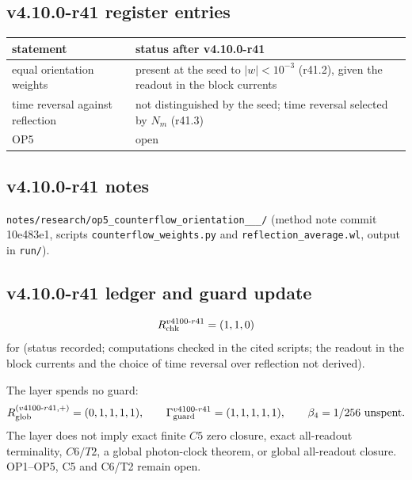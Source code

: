 \subsection*{v4.10.0-r41 register entries}
\label{subsec:v4100-r41-register}

\begin{center}
\small
\begin{tabular}{@{}>{\raggedright\arraybackslash}p{}>{\raggedright\arraybackslash}p{}@{}}
\toprule
statement & status after v4.10.0-r41\\
\midrule
equal orientation weights & present at the seed to \(|w|<10^{-3}\) (r41.2), given the readout in the block currents\\
time reversal against reflection & not distinguished by the seed; time reversal selected by \(N_m\) (r41.3)\\
OP5 & open\\
\bottomrule
\end{tabular}
\end{center}

\subsection*{v4.10.0-r41 notes}
\label{subsec:v4100-r41-notes}

\texttt{notes/\allowbreak research/\allowbreak op5\_\allowbreak counterflow\_\allowbreak orientation\_\_\_/} (method note commit 10e483e1,
scripts \texttt{counterflow\_\allowbreak weights.py} and \texttt{reflection\_\allowbreak average.wl}, output in \texttt{run/}).

\subsection*{v4.10.0-r41 ledger and guard update}
\label{subsec:v4100-r41-ledger-guard}

\[
R_{\rm chk}^{v4100\text{-}r41}=(1,1,0)
\]
for (status recorded; computations checked in the cited scripts; the readout in the block currents and the choice of time reversal over
reflection not derived).

The layer spends no guard:
\[
R_{\rm glob}^{(v4100\text{-}r41,+)}=(0,1,1,1,1),
\qquad
\Gamma_{\rm guard}^{v4100\text{-}r41}=(1,1,1,1,1),
\qquad
\beta_4=1/256\ \text{unspent}.
\]
The layer does not imply exact finite \(C5\) zero closure, exact all-readout terminality, \(C6/T2\), a global photon-clock theorem,
or global all-readout closure.  OP1--OP5, C5 and C6/T2 remain open.

